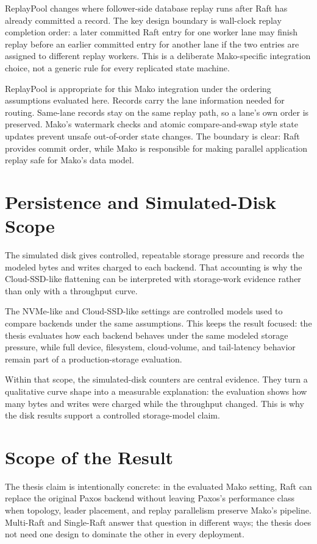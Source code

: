ReplayPool changes where follower-side database replay runs after Raft has
already committed a record. The key design boundary is wall-clock replay
completion order: a later committed Raft entry for one worker lane may finish
replay before an earlier committed entry for another lane if the two entries
are assigned to different replay workers. This is a deliberate Mako-specific
integration choice, not a generic rule for every replicated state machine.

ReplayPool is appropriate for this Mako integration under the ordering
assumptions evaluated here. Records carry the lane information needed for
routing. Same-lane records stay on the same replay path, so a lane's own order
is preserved. Mako's watermark checks and atomic compare-and-swap style state
updates prevent unsafe out-of-order state changes. The boundary is clear: Raft
provides commit order, while Mako is responsible for making parallel
application replay safe for Mako's data model.

\section{Persistence and Simulated-Disk Scope}

The simulated disk gives controlled, repeatable storage pressure and records
the modeled bytes and writes charged to each backend. That accounting is why
the Cloud-SSD-like flattening can be interpreted with storage-work evidence
rather than only with a throughput curve.

The NVMe-like and Cloud-SSD-like settings are controlled models used to compare
backends under the same assumptions. This keeps the result focused: the thesis
evaluates how each backend behaves under the same modeled storage pressure,
while full device, filesystem, cloud-volume, and tail-latency behavior remain
part of a production-storage evaluation.

Within that scope, the simulated-disk counters are central evidence. They turn
a qualitative curve shape into a measurable explanation: the evaluation shows
how many bytes and writes were charged while the throughput changed. This is
why the disk results support a controlled storage-model claim.

\section{Scope of the Result}

The thesis claim is intentionally concrete: in the evaluated Mako setting, Raft
can replace the original Paxos backend without leaving Paxos's performance
class when topology, leader placement, and replay parallelism preserve Mako's
pipeline. Multi-Raft and Single-Raft answer that question in different ways;
the thesis does not need one design to dominate the other in every deployment.

